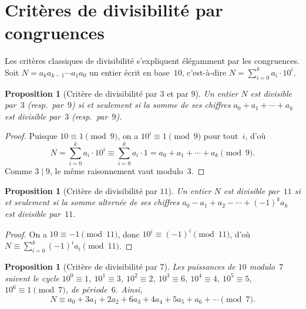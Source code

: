 \documentclass[12pt,a4paper,openany]{book}
\theoremstyle{definition}
\theoremstyle{plain}
\newtheorem{proposition}[definition]{Proposition}
\theoremstyle{remark}
\begin{document}
\section{Critères de divisibilité par congruences}
\label{sec:cong-divis}

Les critères classiques de divisibilité s'expliquent élégamment par les congruences.
Soit $N = a_k a_{k-1} \cdots a_1 a_0$ un entier écrit en base~$10$, c'est-à-dire
$N = \sum_{i=0}^{k} a_i \cdot 10^i$.

\begin{proposition}[Critère de divisibilité par $3$ et par $9$]
\label{prop:div-3-9}
Un entier $N$ est divisible par~$3$ (resp.\ par~$9$) si et seulement si la somme
de ses chiffres $a_0 + a_1 + \cdots + a_k$ est divisible par~$3$ (resp.\ par~$9$).
\end{proposition}

\begin{proof}
Puisque $10 \equiv 1 \pmod{9}$, on a $10^i \equiv 1 \pmod{9}$ pour tout~$i$, d'où
\[
  N = \sum_{i=0}^{k} a_i \cdot 10^i \equiv \sum_{i=0}^{k} a_i \cdot 1
  = a_0 + a_1 + \cdots + a_k \pmod{9}.
\]
Comme $3 \mid 9$, le même raisonnement vaut modulo~$3$.
\end{proof}

\begin{proposition}[Critère de divisibilité par $11$]
\label{prop:div-11}
Un entier $N$ est divisible par~$11$ si et seulement si la somme alternée de ses
chiffres $a_0 - a_1 + a_2 - \cdots + (-1)^k a_k$ est divisible par~$11$.
\end{proposition}

\begin{proof}
On a $10 \equiv -1 \pmod{11}$, donc $10^i \equiv (-1)^i \pmod{11}$, d'où
$N \equiv \sum_{i=0}^{k} (-1)^i a_i \pmod{11}$.
\end{proof}

\begin{proposition}[Critère de divisibilité par $7$]
\label{prop:div-7}
Les puissances de $10$ modulo~$7$ suivent le cycle
$10^0 \equiv 1$, $10^1 \equiv 3$, $10^2 \equiv 2$, $10^3 \equiv 6$,
$10^4 \equiv 4$, $10^5 \equiv 5$, $10^6 \equiv 1 \pmod{7}$,
de période~$6$. Ainsi,
\[
  N \equiv a_0 + 3a_1 + 2a_2 + 6a_3 + 4a_4 + 5a_5 + a_6 + \cdots \pmod{7}.
\]
\end{proposition}
\end{document}
